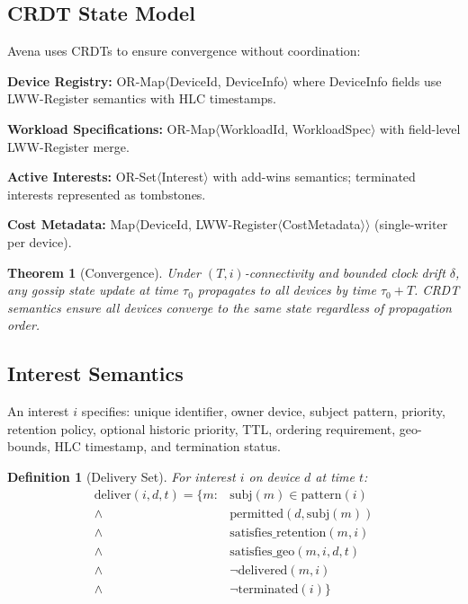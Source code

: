 \documentclass[journal]{IEEEtran}
\newtheorem{theorem}{Theorem}
\newtheorem{definition}{Definition}
\begin{document}
\subsection{CRDT State Model}

Avena uses CRDTs to ensure convergence without coordination:

\textbf{Device Registry:} OR-Map$\langle$DeviceId, DeviceInfo$\rangle$ where DeviceInfo fields use LWW-Register semantics with HLC timestamps.

\textbf{Workload Specifications:} OR-Map$\langle$WorkloadId, WorkloadSpec$\rangle$ with field-level LWW-Register merge.

\textbf{Active Interests:} OR-Set$\langle$Interest$\rangle$ with add-wins semantics; terminated interests represented as tombstones.

\textbf{Cost Metadata:} Map$\langle$DeviceId, LWW-Register$\langle$CostMetadata$\rangle\rangle$ (single-writer per device).

\begin{theorem}[Convergence]
Under $(T, i)$-connectivity and bounded clock drift $\delta$, any gossip state update at time $\tau_0$ propagates to all devices by time $\tau_0 + T$. CRDT semantics ensure all devices converge to the same state regardless of propagation order.
\end{theorem}

\subsection{Interest Semantics}

An interest $i$ specifies: unique identifier, owner device, subject pattern, priority, retention policy, optional historic priority, TTL, ordering requirement, geo-bounds, HLC timestamp, and termination status.

\begin{definition}[Delivery Set]
For interest $i$ on device $d$ at time $t$:
\begin{align*}
\text{deliver}(i, d, t) = \{m : &\text{subj}(m) \in \text{pattern}(i) \\
\land\ &\text{permitted}(d, \text{subj}(m)) \\
\land\ &\text{satisfies\_retention}(m, i) \\
\land\ &\text{satisfies\_geo}(m, i, d, t) \\
\land\ &\neg\text{delivered}(m, i) \\
\land\ &\neg\text{terminated}(i)\}
\end{align*}
\end{definition}
\end{document}

